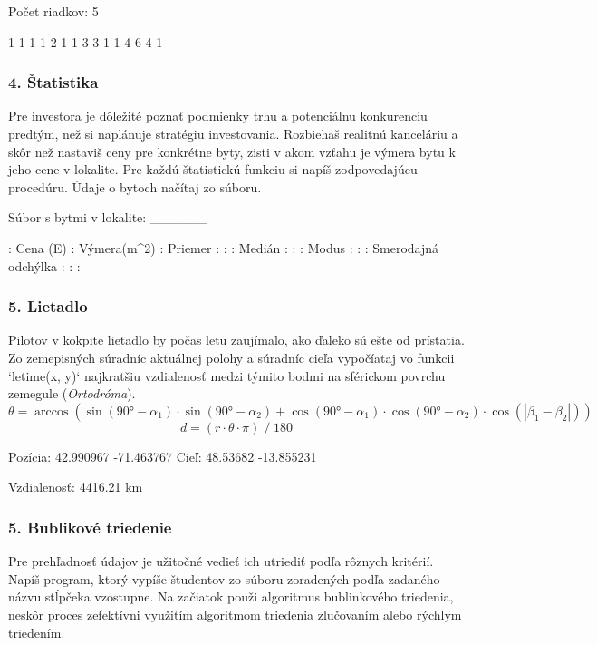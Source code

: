 \begin{code}
Počet riadkov: 5

    1
   1 1
  1 2 1
 1 3 3 1
1 4 6 4 1
\end{code}

\subsubsection*{4. Štatistika}
Pre investora je dôležité poznať podmienky trhu a potenciálnu konkurenciu predtým, než si naplánuje stratégiu investovania. Rozbiehaš realitnú kanceláriu a skôr než nastaviš ceny pre konkrétne byty, zisti v akom vzťahu je výmera bytu k jeho cene v lokalite. Pre každú štatistickú funkciu si napíš zodpovedajúcu procedúru. Údaje o bytoch načítaj zo súboru.

\begin{code}
Súbor s bytmi v lokalite: ______

                    :   Cena (E)  :   Výmera(m^2) :
Priemer             :             :               :
Medián              :             :               :
Modus               :             :               :
Smerodajná odchýlka :             :               :
\end{code}


\subsubsection*{5. Lietadlo}
Pilotov v kokpite lietadlo by počas letu zaujímalo, ako ďaleko sú ešte od prístatia. Zo zemepisných súradníc aktuálnej polohy a súradníc cieľa vypočíataj vo funkcii `letime(x, y)` najkratšiu vzdialenosť medzi týmito bodmi na sférickom povrchu zemegule (\textit{Ortodróma}).
$$ \theta = \arccos(\sin(90° - \alpha_1) \cdot \sin(90° - \alpha_2) + \cos(90° - \alpha_1) \cdot \cos(90° - \alpha_2) \cdot \cos(|\beta_1 - \beta_2|)) $$
$$ d = (r \cdot \theta \cdot \pi)\;/\;180 $$

\begin{code}
Pozícia: 42.990967 -71.463767
Cieľ: 48.53682 -13.855231

Vzdialenosť: 4416.21 km
\end{code}


\subsubsection*{5. Bublikové triedenie}
Pre prehľadnosť údajov je užitočné vedieť ich utriediť podľa rôznych kritérií. Napíš program, ktorý vypíše študentov zo súboru zoradených podľa zadaného názvu stĺpčeka vzostupne.  Na začiatok použi algoritmus bublinkového triedenia, neskôr proces zefektívni využitím algoritmom triedenia zlučovaním alebo rýchlym triedením.

